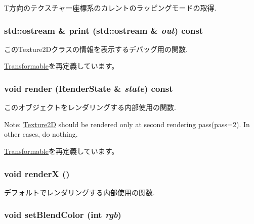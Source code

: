 T方向のテクスチャー座標系のカレントのラッピングモードの取得. \hypertarget{classm3g_1_1Texture2D_6fea17fa1532df3794f8cb39cb4f911f}{
\subsubsection[{print}]{\setlength{\rightskip}{0pt plus 5cm}std::ostream \& print (std::ostream \& {\em out}) const}}
\label{classm3g_1_1Texture2D_6fea17fa1532df3794f8cb39cb4f911f}


このTexture2Dクラスの情報を表示するデバッグ用の関数. 

\hyperlink{classm3g_1_1Transformable_6fea17fa1532df3794f8cb39cb4f911f}{Transformable}を再定義しています。\hypertarget{classm3g_1_1Texture2D_8babc8a79b78615da51161e94029eea9}{
\subsubsection[{render}]{\setlength{\rightskip}{0pt plus 5cm}void render ({\bf RenderState} \& {\em state}) const}}
\label{classm3g_1_1Texture2D_8babc8a79b78615da51161e94029eea9}


このオブジェクトをレンダリングする内部使用の関数.

Note: \hyperlink{classm3g_1_1Texture2D}{Texture2D} should be rendered only at second rendering pass(pass=2). In other cases, do nothing. 

\hyperlink{classm3g_1_1Transformable_8babc8a79b78615da51161e94029eea9}{Transformable}を再定義しています。\hypertarget{classm3g_1_1Texture2D_443a7a301f77f625335ecc06d13bad06}{
\subsubsection[{renderX}]{\setlength{\rightskip}{0pt plus 5cm}void renderX ()}}
\label{classm3g_1_1Texture2D_443a7a301f77f625335ecc06d13bad06}


デフォルトでレンダリングする内部使用の関数. \hypertarget{classm3g_1_1Texture2D_b5a6333203f443fb1f66ea2e39d4de1b}{
\subsubsection[{setBlendColor}]{\setlength{\rightskip}{0pt plus 5cm}void setBlendColor (int {\em rgb})}}
\label{classm3g_1_1Texture2D_b5a6333203f443fb1f66ea2e39d4de1b}


